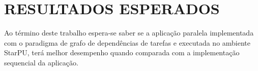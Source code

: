 
\chapter{RESULTADOS ESPERADOS}
\label{chap:resultados-esperados}

Ao término deste trabalho espera-se saber se a aplicação paralela implementada com o paradigma de grafo de dependências de tarefas e executada no ambiente StarPU,
terá melhor desempenho quando comparada com a implementação sequencial da aplicação.